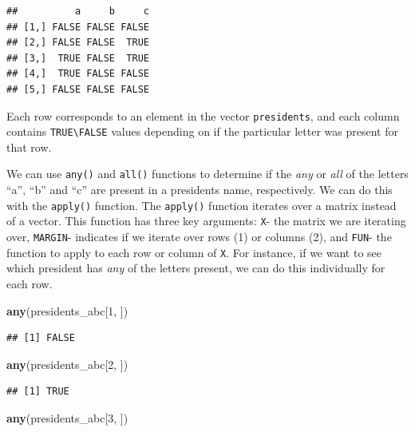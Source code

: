 \documentclass[
]{book}
\newenvironment{Shaded}{\begin{snugshade}}{\end{snugshade}}
\newcommand{\DecValTok}[1]{\textcolor[rgb]{0.00,0.00,0.81}{#1}}
\newcommand{\KeywordTok}[1]{\textcolor[rgb]{0.13,0.29,0.53}{\textbf{#1}}}
\newcommand{\NormalTok}[1]{#1}
\begin{document}
\begin{verbatim}
##          a     b     c
## [1,] FALSE FALSE FALSE
## [2,] FALSE FALSE  TRUE
## [3,]  TRUE FALSE  TRUE
## [4,]  TRUE FALSE FALSE
## [5,] FALSE FALSE FALSE
\end{verbatim}

Each row corresponds to an element in the vector \texttt{presidents}, and each column contains \texttt{TRUE\textbackslash{}FALSE} values depending on if the particular letter was present for that row.

We can use \texttt{any()} and \texttt{all()} functions to determine if the \emph{any} or \emph{all} of the letters ``a'', ``b'' and ``c'' are present in a presidents name, respectively. We can do this with the \texttt{apply()} function. The \texttt{apply()} function iterates over a matrix instead of a vector. This function has three key arguments: \texttt{X}- the matrix we are iterating over, \texttt{MARGIN}- indicates if we iterate over rows (1) or columns (2), and \texttt{FUN}- the function to apply to each row or column of \texttt{X}. For instance, if we want to see which president has \emph{any} of the letters present, we can do this individually for each row.

\begin{Shaded}
\begin{Highlighting}[]
\KeywordTok{any}\NormalTok{(presidents_abc[}\DecValTok{1}\NormalTok{, ])}
\end{Highlighting}
\end{Shaded}

\begin{verbatim}
## [1] FALSE
\end{verbatim}

\begin{Shaded}
\begin{Highlighting}[]
\KeywordTok{any}\NormalTok{(presidents_abc[}\DecValTok{2}\NormalTok{, ])}
\end{Highlighting}
\end{Shaded}

\begin{verbatim}
## [1] TRUE
\end{verbatim}

\begin{Shaded}
\begin{Highlighting}[]
\KeywordTok{any}\NormalTok{(presidents_abc[}\DecValTok{3}\NormalTok{, ])}
\end{Highlighting}
\end{Shaded}
\end{document}
